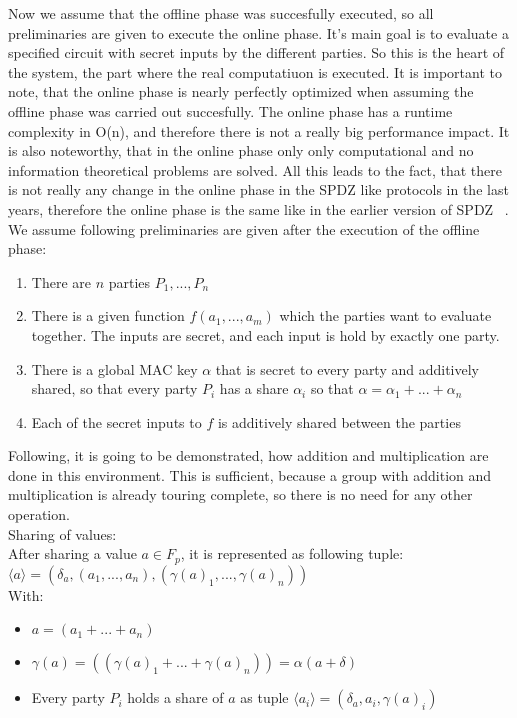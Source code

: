 \documentclass[english,runningheads,a4paper]{llncs}[2018/03/10]
\begin{document}
Now we assume that the offline phase was succesfully executed, so all preliminaries are given to execute the online phase. It's main goal is to evaluate a specified circuit with secret inputs by the different parties. So this is the heart of the system, the part where the real computatiuon is executed. 
It is important to note, that the online phase is nearly perfectly optimized when assuming the offline phase was carried out succesfully. The online phase has a runtime complexity in O(n), and therefore there is not a really big performance impact. It is also noteworthy, that in the online phase only only computational and no information theoretical problems are solved. All this leads to the fact, that there is not really any change in the online phase in the SPDZ like protocols in the last years, therefore the online phase is the same like in the earlier version of SPDZ ~\cite{cryptoeprint:2011:535}.\\


We assume following preliminaries are given after the execution of the offline phase:\\
\begin{enumerate}
\item There are \(n\) parties \(P_1,...,P_n\)
\item There is a given function \(f(a_1,...,a_m)\) which the parties want to evaluate together. The inputs are secret, and each input is hold by exactly one party.
\item There is a global MAC key \( \alpha\) that is secret to every party and additively shared, so that every party \( P_i\) has a share  \( \alpha_i\) so that  \( \alpha=\alpha_1+...+\alpha_n\)
\item Each of the secret inputs to \(f\) is additively shared between the parties

\end{enumerate}

Following, it is going to be demonstrated, how addition and multiplication are done in this environment. This is sufficient, because a group with addition and multiplication is already touring complete, so there is no need for any other operation.\\

Sharing of values:\\
After sharing a value \( a \in F_p\), it is represented as following tuple:\\
$\langle a\rangle=(\delta_a, (a_1,...,a_n),(\gamma (a)_1,...,\gamma (a)_n))$
\\With:
\begin{itemize}
\item $ a=(a_1+...+a_n)$
\item $ \gamma (a)=((\gamma (a)_1+...+\gamma (a)_n))=\alpha(a+\delta)$
\item Every party \( P_i\) holds a share of \( a\) as tuple \(\langle a_i\rangle = (\delta_a,a_i,\gamma(a)_i )\)

\end{itemize}
\end{document}
